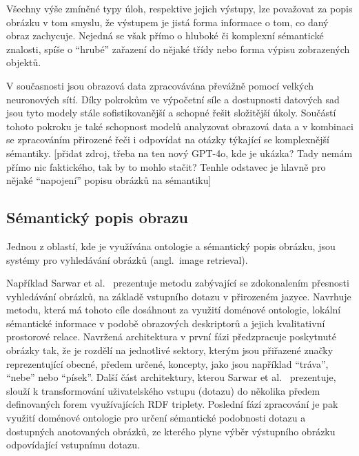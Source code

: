 Všechny výše zmíněné typy úloh, respektive jejich výstupy, lze považovat za popis obrázku v tom smyslu,
že výstupem je jistá forma informace o tom, co daný obraz zachycuje.
Nejedná se však přímo o hluboké či komplexní sémantické znalosti, spíše o \enquote{hrubé} zařazení do nějaké třídy nebo forma výpisu zobrazených objektů.

V současnosti jsou obrazová data zpracovávána převážně pomocí velkých neuronových sítí.
Díky pokrokům ve výpočetní síle a dostupnosti datových sad jsou tyto modely stále sofistikovanější a schopné řešit složitější úkoly.
Součástí tohoto pokroku je také schopnost modelů analyzovat obrazová data a v kombinaci se zpracováním přirozené řeči i
odpovídat na otázky týkající se komplexnější sémantiky.
{\footnotesize\color{red} [přidat zdroj, třeba na ten nový GPT-4o, kde je ukázka? Tady nemám přímo nic faktického, tak by to mohlo stačit? Tenhle odstavec je hlavně pro nějaké \enquote{napojení} popisu obrázků na sémantiku]}

\newpage
\subsection{Sémantický popis obrazu}
Jednou z oblastí, kde je využívána ontologie a sémantický popis obrázku, jsou systémy pro vyhledávání obrázků (angl.~image retrieval).

Například Sarwar et al.~\cite{SARWAR2013285} prezentuje metodu zabývající se zdokonalením přesnosti vyhledávání obrázků,
na základě vstupního dotazu v přirozeném jazyce.
Navrhuje metodu, která má tohoto cíle dosáhnout za využití doménové ontologie, lokální sémantické informace v podobě
obrazových deskriptorů a jejich kvalitativní prostorové relace.
Navržená architektura v první fázi předzpracuje poskytnuté obrázky tak, že je rozdělí na jednotlivé sektory, kterým jsou
přiřazené značky reprezentující obecné, předem určené, koncepty, jako jsou například \enquote{tráva}, \enquote{nebe} nebo \enquote{písek}.
Další část architektury, kterou Sarwar et al.~\cite{SARWAR2013285} prezentuje, slouží k transformování uživatelského vstupu (dotazu)
do několika předem definovaných forem využívajících RDF triplety.
Poslední fází zpracování je pak využití doménové ontologie pro určení sémantické podobnosti dotazu a dostupných anotovaných obrázků,
ze kterého plyne výběr výstupního obrázku odpovídající vstupnímu dotazu.

